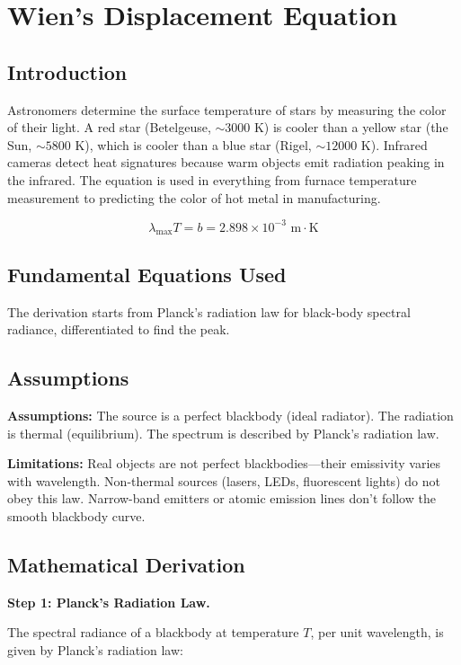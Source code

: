 \chapter{Wien's Displacement Equation}

\section*{Introduction}

Astronomers determine the surface temperature of stars by measuring the color of their light. A red star (Betelgeuse, $\sim 3000$ K) is cooler than a yellow star (the Sun, $\sim 5800$ K), which is cooler than a blue star (Rigel, $\sim 12000$ K). Infrared cameras detect heat signatures because warm objects emit radiation peaking in the infrared. The equation is used in everything from furnace temperature measurement to predicting the color of hot metal in manufacturing.



\[
\lambda_{\max} T = b = 2.898 \times 10^{-3} \text{ m}\cdot\text{K}
\]

\section*{Fundamental Equations Used}

The derivation starts from Planck's radiation law for black-body spectral radiance, differentiated to find the peak.

\section*{Assumptions}

\textbf{Assumptions:} The source is a perfect blackbody (ideal radiator). The radiation is thermal (equilibrium). The spectrum is described by Planck's radiation law.


\textbf{Limitations:} Real objects are not perfect blackbodies---their emissivity varies with wavelength. Non-thermal sources (lasers, LEDs, fluorescent lights) do not obey this law. Narrow-band emitters or atomic emission lines don't follow the smooth blackbody curve.


\section*{Mathematical Derivation}

\textbf{Step 1: Planck's Radiation Law.}

The spectral radiance of a blackbody at temperature $T$, per unit wavelength, is given by Planck's radiation law:

